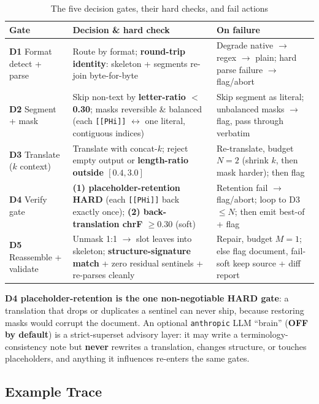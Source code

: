 \documentclass[12pt,a4paper]{article}
\begin{document}
\begin{table}[H]
\centering
\caption{The five decision gates, their hard checks, and fail actions}
\small
\begin{tabularx}{\linewidth}{@{} l L L @{}}
\toprule
\textbf{Gate} & \textbf{Decision \& hard check} & \textbf{On failure} \\
\midrule
\textbf{D1} Format detect + parse & Route by format; \textbf{round-trip identity}: skeleton + segments re-join byte-for-byte & Degrade native $\rightarrow$ regex $\rightarrow$ plain; hard parse failure $\rightarrow$ flag/abort \\
\textbf{D2} Segment + mask & Skip non-text by \textbf{letter-ratio $<$ 0.30}; masks reversible \& balanced (each \texttt{[[PHi]]} $\leftrightarrow$ one literal, contiguous indices) & Skip segment as literal; unbalanced masks $\rightarrow$ flag, pass through verbatim \\
\textbf{D3} Translate ($k$ context) & Translate with concat-$k$; reject empty output or \textbf{length-ratio outside $[0.4, 3.0]$} & Re-translate, budget $N=2$ (shrink $k$, then mask harder); then flag \\
\textbf{D4} Verify gate & \textbf{(1) placeholder-retention HARD} (each \texttt{[[PHi]]} back exactly once); \textbf{(2) back-translation chrF $\geq 0.30$} (soft) & Retention fail $\rightarrow$ flag/abort; loop to D3 $\leq N$; then emit best-of + flag \\
\textbf{D5} Reassemble + validate & Unmask 1:1 $\rightarrow$ slot leaves into skeleton; \textbf{structure-signature match} + zero residual sentinels + re-parses cleanly & Repair, budget $M=1$; else flag document, fail-soft keep source + diff report \\
\bottomrule
\end{tabularx}
\end{table}

\textbf{D4 placeholder-retention is the one non-negotiable HARD gate}: a translation that drops or duplicates a sentinel can never ship, because restoring masks would corrupt the document. An optional \texttt{anthropic} LLM ``brain'' (\textbf{OFF by default}) is a strict-superset advisory layer: it may write a terminology-consistency note but \textbf{never} rewrites a translation, changes structure, or touches placeholders, and anything it influences re-enters the same gates.

\subsection{Example Trace}
\end{document}

